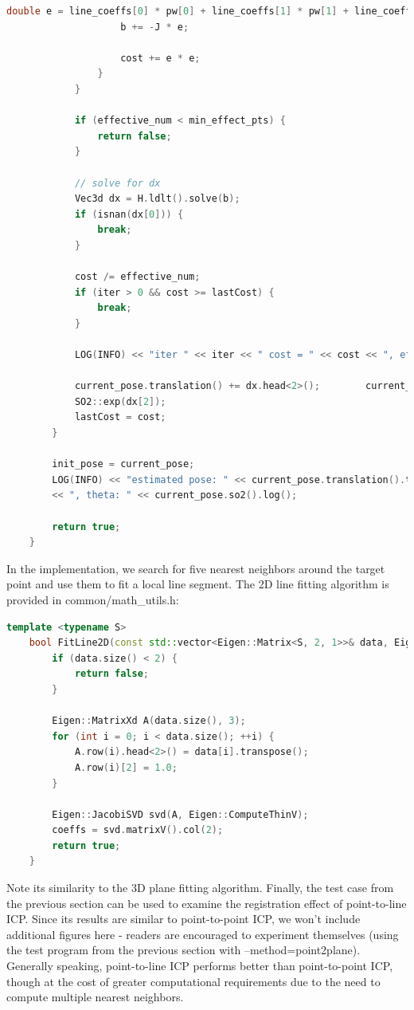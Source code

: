 \begin{lstlisting}[language=c++,caption=src/ch6/icp\_2d.cc]
					double e = line_coeffs[0] * pw[0] + line_coeffs[1] * pw[1] + line_coeffs[2];
					b += -J * e;
					
					cost += e * e;
				}
			}
			
			if (effective_num < min_effect_pts) {
				return false;
			}
			
			// solve for dx
			Vec3d dx = H.ldlt().solve(b);
			if (isnan(dx[0])) {
				break;
			}
			
			cost /= effective_num;
			if (iter > 0 && cost >= lastCost) {
				break;
			}
			
			LOG(INFO) << "iter " << iter << " cost = " << cost << ", effect num: " << effective_num;
			
			current_pose.translation() += dx.head<2>();        current_pose.so2() = current_pose.so2() * 
			SO2::exp(dx[2]);
			lastCost = cost;
		}
		
		init_pose = current_pose;
		LOG(INFO) << "estimated pose: " << current_pose.translation().transpose()
		<< ", theta: " << current_pose.so2().log();
		
		return true;
	}
\end{lstlisting}

In the implementation, we search for five nearest neighbors around the target point and use them to fit a local line segment. The 2D line fitting algorithm is provided in common/math\_utils.h:

\begin{lstlisting}[language=c++,caption=src/common/math\_utils.h]
	template <typename S>
	bool FitLine2D(const std::vector<Eigen::Matrix<S, 2, 1>>& data, Eigen::Matrix<S, 3, 1>& coeffs) {
		if (data.size() < 2) {
			return false;
		}
		
		Eigen::MatrixXd A(data.size(), 3);
		for (int i = 0; i < data.size(); ++i) {
			A.row(i).head<2>() = data[i].transpose();
			A.row(i)[2] = 1.0;
		}
		
		Eigen::JacobiSVD svd(A, Eigen::ComputeThinV);
		coeffs = svd.matrixV().col(2);
		return true;
	}
\end{lstlisting}

Note its similarity to the 3D plane fitting algorithm. Finally, the test case from the previous section can be used to examine the registration effect of point-to-line ICP. Since its results are similar to point-to-point ICP, we won't include additional figures here - readers are encouraged to experiment themselves (using the test program from the previous section with --method=point2plane). Generally speaking, point-to-line ICP performs better than point-to-point ICP, though at the cost of greater computational requirements due to the need to compute multiple nearest neighbors.

